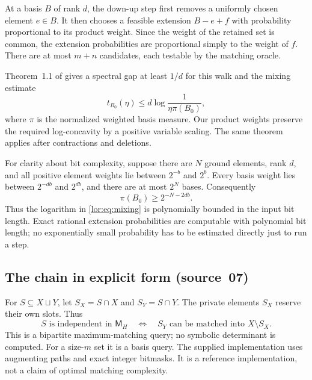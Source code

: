 \documentclass[11pt]{article}
\numberwithin{equation}{section}
\theoremstyle{definition}
\begin{document}
At a basis $B$ of rank $d$, the down-up step first removes a uniformly
chosen element $e\in B$. It then chooses a feasible extension
$B-e+f$ with probability proportional to its product weight. Since the
weight of the retained set is common, the extension probabilities are
proportional simply to the weight of $f$. There are at most $m+n$
candidates, each testable by the matching oracle.

Theorem~1.1 of \cite{ALOV} gives a spectral gap at least $1/d$ for this walk
and the mixing estimate
\begin{equation}
 t_{B_0}(\eta)\le d\log\frac1{\eta\pi(B_0)},
 \label{lor:eq:mixing}
\end{equation}
where $\pi$ is the normalized weighted basis measure. Our product weights
preserve the required log-concavity by a positive variable scaling.
The same theorem applies after contractions and deletions.

For clarity about bit complexity, suppose there are $N$ ground elements,
rank $d$, and all positive element weights lie between $2^{-b}$ and $2^b$.
Every basis weight lies between $2^{-db}$ and $2^{db}$, and there are at
most $2^N$ bases. Consequently
\begin{equation}
 \pi(B_0)\ge2^{-N-2db}.
 \label{lor:eq:startingmass}
\end{equation}
Thus the logarithm in \eqref{lor:eq:mixing} is polynomially bounded in the
input bit length. Exact rational extension probabilities are computable
with polynomial bit length; no exponentially small probability has to be
estimated directly just to run a step.


\subsection{The chain in explicit form (source~07)}
\label{lor:sec:sp:chain}
For $S\subseteq X\sqcup Y$, let $S_X=S\cap X$ and $S_Y=S\cap Y$.
The private elements $S_X$ reserve their own slots. Thus
\begin{equation}
 S\text{ is independent in }\mathsf M_H
 \quad\Longleftrightarrow\quad
 S_Y\text{ can be matched into }X\setminus S_X.
 \label{lor:sp:eq:oracle}
\end{equation}
This is a bipartite maximum-matching query; no symbolic determinant is computed.
For a size-$m$ set it is a basis query. The supplied implementation uses
augmenting paths and exact integer bitmasks. It is a reference implementation,
not a claim of optimal matching complexity.
\end{document}
